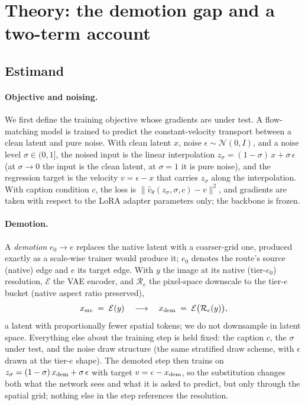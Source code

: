 \section{Theory: the demotion gap and a two-term account}
\label{sec:theory}

\subsection{Estimand}
\label{sec:estimand}

\paragraph{Objective and noising.}
We first define the training objective whose gradients are under test.
A flow-matching model is trained to predict the constant-velocity
transport between a clean latent and pure noise. With clean latent $x$,
noise $\epsilon \sim \mathcal{N}(0, I)$, and a noise level
$\sigma \in (0,1]$, the noised input is the linear interpolation
$z_\sigma = (1-\sigma)\,x + \sigma\,\epsilon$ (at $\sigma \to 0$ the
input is the clean latent, at $\sigma = 1$ it is pure noise), and the
regression target is the velocity $v = \epsilon - x$ that carries
$z_\sigma$ along the interpolation. With caption condition $c$, the loss
is $\|\hat v_\theta(z_\sigma, \sigma, c) - v\|^2$, and gradients are
taken with respect to the LoRA adapter parameters only; the backbone is
frozen.

\paragraph{Demotion.}
A \emph{demotion} $e_0 {\to} e$ replaces the native latent
with a coarser-grid one, produced exactly as a scale-wise trainer would
produce it; $e_0$ denotes the route's source (native) edge
and $e$ its target edge. With $y$ the image at its native (tier-$e_0$)
resolution, $\mathcal{E}$ the VAE encoder, and $\mathcal{R}_e$ the
pixel-space downscale to the tier-$e$ bucket (native aspect ratio
preserved),
\begin{equation*}
x_{\mathrm{src}} \;=\; \mathcal{E}(y)
\quad\longrightarrow\quad
x_{\mathrm{dem}} \;=\; \mathcal{E}\big(\mathcal{R}_{e}(y)\big),
\end{equation*}
a latent with proportionally fewer spatial tokens; we do not downsample
in latent space. Everything else about the training step is held fixed:
the caption $c$, the $\sigma$ under test, and the noise draw structure
(the same stratified draw scheme, with $\epsilon$ drawn at the tier-$e$
shape). The demoted step then trains on
$z_\sigma = (1-\sigma)\,x_{\mathrm{dem}} + \sigma\,\epsilon$ with target
$v = \epsilon - x_{\mathrm{dem}}$, so the substitution changes both what the network
sees and what it is asked to predict, but only through the spatial
grid; nothing else in the step references the resolution.

